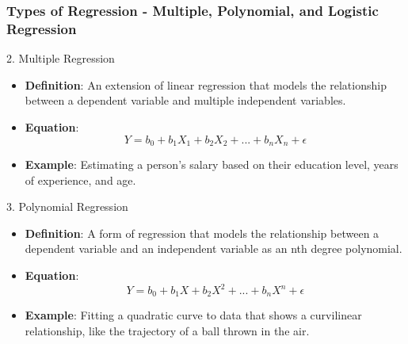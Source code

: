 \documentclass{beamer}
\begin{document}
\begin{frame}[fragile]
    \frametitle{Types of Regression - Multiple, Polynomial, and Logistic Regression}
    \begin{block}{2. Multiple Regression}
        \begin{itemize}
            \item \textbf{Definition}: An extension of linear regression that models the relationship between a dependent variable and multiple independent variables.
            \item \textbf{Equation}:
            \begin{equation}
            Y = b_0 + b_1X_1 + b_2X_2 + ... + b_nX_n + \epsilon
            \end{equation}
            \item \textbf{Example}: Estimating a person's salary based on their education level, years of experience, and age.
        \end{itemize}
    \end{block}

    \begin{block}{3. Polynomial Regression}
        \begin{itemize}
            \item \textbf{Definition}: A form of regression that models the relationship between a dependent variable and an independent variable as an nth degree polynomial.
            \item \textbf{Equation}:
            \begin{equation}
            Y = b_0 + b_1X + b_2X^2 + ... + b_nX^n + \epsilon
            \end{equation}
            \item \textbf{Example}: Fitting a quadratic curve to data that shows a curvilinear relationship, like the trajectory of a ball thrown in the air.
        \end{itemize}
    \end{block}


\end{frame}
\end{document}
